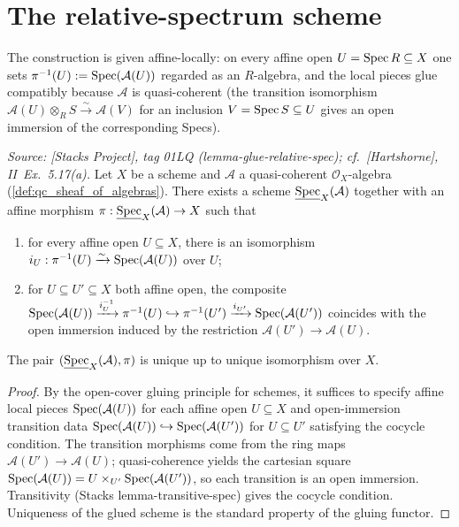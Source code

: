 \section{The relative-spectrum scheme}
\label{sec:relspec_scheme}

The construction is given affine-locally: on every affine open \(U = \operatorname{Spec} R \subseteq X\) one
sets \(\pi^{-1}(U) := \operatorname{Spec}(\mathcal{A}(U))\) regarded as an \(R\)-algebra, and the local pieces
glue compatibly because \(\mathcal{A}\) is quasi-coherent (the transition isomorphism
\(\mathcal{A}(U) \otimes_R S \xrightarrow{\sim} \mathcal{A}(V)\) for an inclusion
\(V = \operatorname{Spec} S \subseteq U\) gives an open immersion of the corresponding Specs).

\begin{theorem}
  \label{thm:relative_spec_exists}
  \textit{Source: [Stacks Project], tag 01LQ (lemma-glue-relative-spec);
  cf.\ [Hartshorne], II~Ex.~5.17(a).}
  Let \(X\) be a scheme and \(\mathcal{A}\) a quasi-coherent \(\mathcal{O}_X\)-algebra
  (\cref{def:qc_sheaf_of_algebras}). There exists a scheme
  \(\underline{\operatorname{Spec}}_X(\mathcal{A})\) together with an affine morphism
  \(\pi : \underline{\operatorname{Spec}}_X(\mathcal{A}) \to X\) such that
  \begin{enumerate}
    \item for every affine open \(U \subseteq X\), there is an isomorphism
      \(i_U : \pi^{-1}(U) \xrightarrow{\sim} \operatorname{Spec}(\mathcal{A}(U))\) over \(U\);
    \item for \(U \subseteq U' \subseteq X\) both affine open, the composite
      $\operatorname{Spec}(\mathcal{A}(U)) \xrightarrow{i_U^{-1}} \pi^{-1}(U) \hookrightarrow
      \pi^{-1}(U') \xrightarrow{i_{U'}} \operatorname{Spec}(\mathcal{A}(U'))$
      coincides with the open immersion induced by the restriction
      \(\mathcal{A}(U') \to \mathcal{A}(U)\).
  \end{enumerate}
  The pair \((\underline{\operatorname{Spec}}_X(\mathcal{A}), \pi)\) is unique up to unique isomorphism
  over \(X\).
\end{theorem}

\begin{proof}
  By the open-cover gluing principle for schemes, it suffices to specify affine local
  pieces \(\operatorname{Spec}(\mathcal{A}(U))\) for each affine open \(U \subseteq X\) and
  open-immersion transition data
  \(\operatorname{Spec}(\mathcal{A}(U)) \hookrightarrow \operatorname{Spec}(\mathcal{A}(U'))\) for \(U \subseteq U'\)
  satisfying the cocycle condition. The transition morphisms come from the ring maps
  \(\mathcal{A}(U') \to \mathcal{A}(U)\); quasi-coherence yields the cartesian square
  \(\operatorname{Spec}(\mathcal{A}(U)) = U \times_{U'} \operatorname{Spec}(\mathcal{A}(U'))\), so each transition is an
  open immersion. Transitivity (Stacks lemma-transitive-spec) gives the cocycle condition.
  Uniqueness of the glued scheme is the standard property of the gluing functor.
\end{proof}

